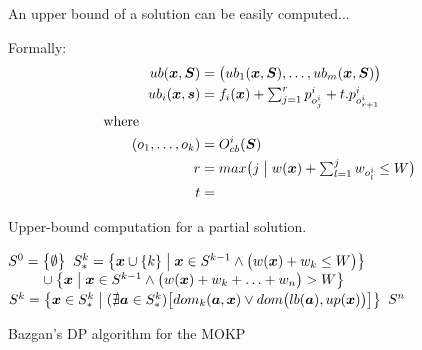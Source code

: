 An upper bound of a solution can be easily computed...

Formally:
\begin{align*}
    ub(\boldsymbol{x}, \boldsymbol{S}) &= \big(ub_1(\boldsymbol{x}, \boldsymbol{S}), \ldots, ub_m(\boldsymbol{x}, \boldsymbol{S})\big) \\
    ub_i(\boldsymbol{x}, \boldsymbol{s}) &= f_i(\boldsymbol{x}) + \textstyle\sum^r_{j=1} p^i_{o^i_j} + t.p^i_{o^i_{r+1}}\\
  \text{where} \phantom{mmmmm} \\
    (o_1, \ldots, o_k) &= O_{cb}^i(\boldsymbol{S}) \\
    r &= max\big( j \;\big|\; w(\boldsymbol{x}) + \textstyle\sum_{l = 1}^j w_{o^i_l} \leq W \big) \\
    t &= \textstyle
\end{align*}

\begin{algorithm}
  \caption{Upper-bound computation for a partial solution.}
  \label{alg:up}
  \begin{algorithmic}[1]
      \State $S^0 = \big\{\emptyset\big\}$
        \State $S_*^k = \big\{\boldsymbol{x} \cup \{k\} \;\big|\; \boldsymbol{x}
          \in S^{k-1} \land \big(w(\boldsymbol{x}) + w_k \leq W\big) \big\}$
        \State $\phantom{\solSett^k = } \cup \big\{ \sol{x} \;\big|\; \sol{x} \in \solSet^{k-1} \logicAnd
          \big(\weight{x} + w_{k} + \ldots + w_n\big) > W \big\}$
        \State $S^k = \big\{\boldsymbol{x} \in S_*^k \;\big|\;
          (\nexists \boldsymbol{a} \in S_*^k)\big[dom_k(\boldsymbol{a}, \boldsymbol{x})
            \lor dom\big(lb(\boldsymbol{a}), up(\boldsymbol{x})\big)\big] \big\}$
      \EndFor
      \State \Return $S^n$
    \EndFunction
  \end{algorithmic}
\end{algorithm}


\begin{algorithm}
  \caption{Bazgan's DP algorithm for the MOKP}
  \label{alg:bazgan}
  
\end{algorithm}



